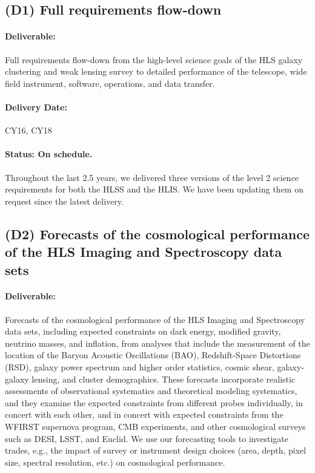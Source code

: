 \subsection*{(D1) Full requirements flow-down}

\paragraph*{Deliverable:} Full requirements flow-down from the high-level science goals of the HLS galaxy clustering and weak lensing survey to detailed performance of the telescope, wide field instrument, software, operations, and data transfer.

\paragraph*{Delivery Date:} CY16, CY18

\paragraph*{Status: On schedule.} Throughout the last 2.5 years, we delivered three versions of the level 2 science requirements for both the HLSS and the HLIS. We have been updating them on request since the latest delivery.

\subsection*{(D2) Forecasts of the cosmological performance of the HLS Imaging
and Spectroscopy data sets}

\paragraph*{Deliverable:} Forecasts of the cosmological performance of the HLS Imaging
and Spectroscopy data sets, including expected constraints on dark energy,
modified gravity, neutrino masses, and inflation, from analyses that include the
measurement of the location of the Baryon Acoustic Oscillations (BAO),
Redshift-Space Distortions (RSD), galaxy power spectrum and higher order
statistics, cosmic shear, galaxy-galaxy lensing, and cluster demographics. These
forecasts incorporate realistic assessments of observational systematics and
theoretical modeling systematics, and they examine the expected constraints from
different probes individually, in concert with each other, and in concert with
expected constraints from the WFIRST supernova program, CMB experiments, and
other cosmological surveys such as DESI, LSST, and Euclid. We use our
forecasting tools to investigate trades, e.g., the impact of survey or
instrument design choices (area, depth, pixel size, spectral resolution, etc.)
on cosmological performance.

